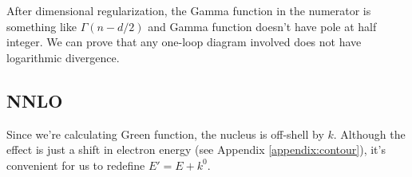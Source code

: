 \documentclass{article}
\begin{document}
After dimensional regularization, the Gamma function in the numerator is something like $\Gamma(n-d/2)$ and Gamma function doesn't have pole at half integer. We can prove that any one-loop diagram involved does not have logarithmic divergence.
\begin{comment}
, for example
\begin{align*}
	  & \mel{0}{\psi_e(0)N(0)(-ie\mu^{-\epsilon})\int\dd^4y\bar\psi_e\psi_e A^0(-iZe\mu^{-\epsilon})\int\dd^4z\bar NNA^0}{0}=\begin{tikzpicture}[baseline=($(p1)!0.5!(x)$)]
		\begin{feynman}
			\vertex (p1);
			\vertex[right=2.5cm of p1] (p2);
			\vertex at ($(p1)!0.5!(p2)+(0,2.5cm)$) (x) ;
			\vertex at ($(p1)!0.3!(x)$) (y1);
			\vertex at ($(p2)!0.3!(x)$) (z1);
			\diagram* {
			(p1) -- [] (x);
			(p2) -- [double distance=1pt] (x);
			(y1) -- [photon,rmomentum=$k_1$] (z1);
			(p1) -- [momentum=\(p\)] (y1);
			(p2) -- [momentum'=$(P_{N}\text{=}m_{N}v_{N})+k$,double distance=1pt] (z1);
			(y1) -- [momentum=\(p+k_1\)] (x);
			(z1) -- [momentum'=\(P_{N}+k-k_1\),double distance=1pt] (x);
			};
		\end{feynman}
	\end{tikzpicture}
\end{align*}
which doesn't have logarithmic divergence.
\end{comment}
\subsection{NNLO}
Since we're calculating Green function, the nucleus is off-shell by $k$. Although the effect is just a shift in electron energy (see Appendix \ref{appendix:contour}), it's convenient for us to redefine $E'=E+k^0$. 
\end{document}
